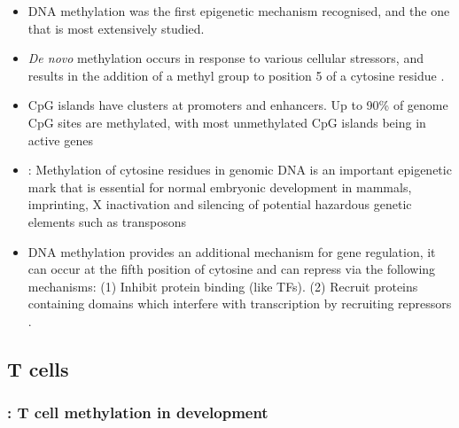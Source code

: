\documentclass[12pt]{article}
\begin{document}
			\begin{itemize}
				\item DNA methylation was the first epigenetic mechanism recognised, and the one that is most extensively studied. \citep{Begin14}
				\item \textit{De novo} methylation occurs in response to various cellular stressors, and results in the addition of a methyl group to position 5 of a cytosine residue \citep{Begin14}.
				\item CpG islands have clusters at promoters and enhancers. Up to 90\% of genome CpG sites are methylated, with most unmethylated CpG islands being in active genes \citep{Begin14}
				\item \citet{Schmidl09}: Methylation of cytosine residues in genomic DNA is an important epigenetic mark that is essential for normal embryonic development in mammals, imprinting, X inactivation and silencing of potential hazardous genetic elements such as transposons
				\item DNA methylation provides an additional mechanism for gene regulation, it can occur at the fifth position of cytosine and can repress via the following mechanisms: (1) Inhibit protein binding (like TFs). (2) Recruit proteins containing domains which interfere with transcription by recruiting repressors \citep{Choukrallah14, Begin14}. 
			\end{itemize}
				
		\subsection{T cells}
			
			\subsubsection{\citeauthor{Begin14}\citeyear{Begin14}: T cell methylation in development}
				
\end{document}
